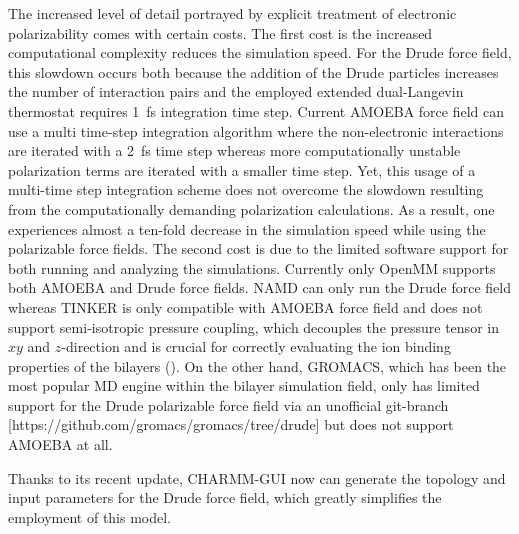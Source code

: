 \documentclass[journal=jacsat,manuscript=article,layout=singlecolumn]{achemso}
\begin{document}
The increased level of detail portrayed by explicit treatment of electronic polarizability comes with certain costs. The first cost is the increased computational complexity reduces the simulation speed. For the Drude force field, this slowdown occurs both because the addition of the Drude particles increases the number of interaction pairs and the employed extended dual-Langevin thermostat requires 1~fs integration time step. Current AMOEBA force field can use a multi time-step integration algorithm where the non-electronic interactions are iterated with a 2~fs time step whereas more computationally unstable polarization terms are iterated with a smaller time step. Yet, this usage of a multi-time step integration scheme does not overcome the slowdown resulting from the computationally demanding polarization calculations. As a result, one experiences almost a ten-fold decrease in the simulation speed while using the polarizable force fields. The second cost is due to the limited software support for both running and analyzing the simulations. Currently only OpenMM supports both AMOEBA and Drude force fields. NAMD can only run the Drude force field whereas TINKER is only compatible with AMOEBA force field and does not support semi-isotropic pressure coupling, which decouples the pressure tensor in $xy$ and $z$-direction and is crucial for correctly evaluating the ion binding properties of the bilayers (). On the other hand, GROMACS, which has been the most popular MD engine within the bilayer simulation field, only has limited support for the Drude polarizable force field via an unofficial git-branch [https://github.com/gromacs/gromacs/tree/drude] but does not support AMOEBA at all.

Thanks to its recent update, CHARMM-GUI now can generate the topology and input parameters for the Drude force field, which greatly simplifies the employment of this model.
\end{document}
